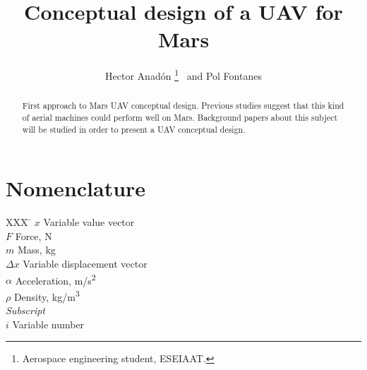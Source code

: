 \documentclass[]{aiaa-tc}%
\title{Conceptual design of a UAV for Mars}
\author{
  Hector Anadón%
    \thanks{Aerospace engineering student, ESEIAAT.}
  \ and Pol Fontanes\thanksibid{1}\\
 }
\begin{document}
\maketitle

\begin{abstract}
	First approach to Mars UAV conceptual design. Previous studies suggest that this kind of aerial machines could perform well on Mars. Background papers about this subject will be studied in order to present a UAV conceptual design.
\end{abstract}

\section*{Nomenclature}

\begin{tabbing}
  XXX \= \kill%
  $x$ \> Variable value vector \\
  $F$ \> Force, N \\
  $m$ \> Mass, kg \\
  $\Delta x$ \> Variable displacement vector \\
  $\alpha$ \> Acceleration, m/s\textsuperscript{2} \\
  $\rho$ \> Density, kg/m\textsuperscript{3} \\ [5pt]
  \textit{Subscript}\\
  $i$ \> Variable number \\
 \end{tabbing}






\newpage


\end{document}
